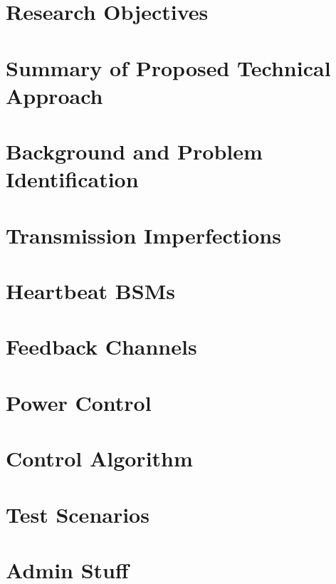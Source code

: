 \documentclass[11pt]{article}
\begin{document}

\section{Research Objectives}



\section{Summary of Proposed Technical Approach} \label{sec-tech-summary}



\section{Background and Problem Identification}



\section{Transmission Imperfections}



\section{Heartbeat BSMs}



\section{Feedback Channels}



\section{Power Control}



\section{Control Algorithm}



\section{Test Scenarios} \label{sec-tech-approach}

 

\section{Admin Stuff}




\newpage
\renewcommand{\thepage}{E--\arabic{page}}
\setcounter{page}{1}


\end{document}
